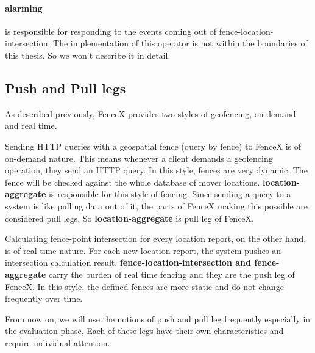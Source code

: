 \documentclass[a4]{report}
\begin{document}
    \paragraph{alarming} is responsible for responding to the events coming out of fence-location-intersection.
    The implementation of this operator is not within the boundaries of this thesis.
    So we won't describe it in detail.

    \subsection{Push and Pull legs}
    As described previously, FenceX provides two styles of geofencing, on-demand and real time.

    Sending HTTP queries with a geospatial fence (query by fence) to FenceX is of on-demand nature.
    This means whenever a client demands a geofencing operation, they send an HTTP query.
    In this style, fences are very dynamic.
    The fence will be checked against the whole database of mover locations.
    \textbf{location-aggregate} is responsible for this style of fencing.
    Since sending a query to a system is like pulling data out of it, the parts of FenceX making this possible are considered pull legs.
    So \textbf{location-aggregate} is pull leg of FenceX.

    Calculating fence-point intersection for every location report, on the other hand, is of real time nature.
    For each new location report, the system pushes an intersection calculation result.
    \textbf{fence-location-intersection and fence-aggregate} carry the burden of real time fencing and they are the push leg of FenceX.
    In this style, the defined fences are more static and do not change frequently over time.

    From now on, we will use the notions of push and pull leg frequently especially in the evaluation phase, Each of
    these legs have their own characteristics and require individual attention.
\end{document}

